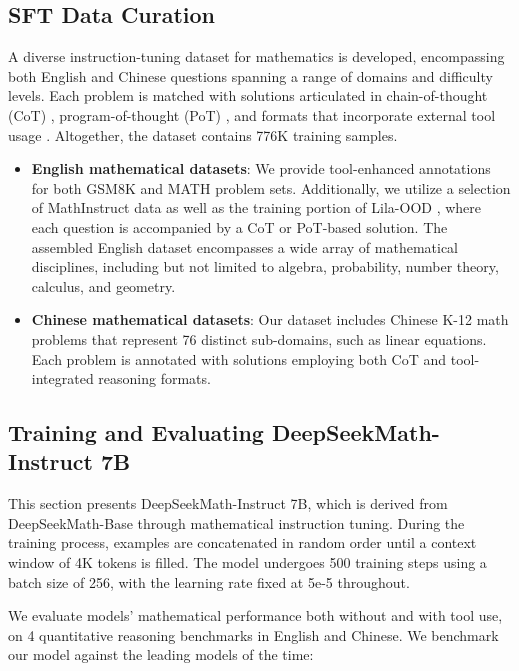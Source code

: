\begin{itemize}[topsep=0pt]
\subsection{SFT Data Curation}

A diverse instruction-tuning dataset for mathematics is developed, encompassing both English and Chinese questions spanning a range of domains and difficulty levels. Each problem is matched with solutions articulated in chain-of-thought (CoT) \citep{cot}, program-of-thought (PoT) \citep{pot,pal}, and formats that incorporate external tool usage \citep{tora}. Altogether, the dataset contains 776K training samples.

\begin{itemize}[topsep=0pt]
    \item \textbf{English mathematical datasets}: We provide tool-enhanced annotations for both GSM8K and MATH problem sets. Additionally, we utilize a selection of MathInstruct \citep{MathInstruct} data as well as the training portion of Lila-OOD \citep{lila}, where each question is accompanied by a CoT or PoT-based solution. The assembled English dataset encompasses a wide array of mathematical disciplines, including but not limited to algebra, probability, number theory, calculus, and geometry.
    \item \textbf{Chinese mathematical datasets}: Our dataset includes Chinese K-12 math problems that represent 76 distinct sub-domains, such as linear equations. Each problem is annotated with solutions employing both CoT and tool-integrated reasoning formats.
\end{itemize}

\subsection{Training and Evaluating DeepSeekMath-Instruct 7B}

This section presents DeepSeekMath-Instruct 7B, which is derived from DeepSeekMath-Base through mathematical instruction tuning. During the training process, examples are concatenated in random order until a context window of 4K tokens is filled. The model undergoes 500 training steps using a batch size of 256, with the learning rate fixed at 5e-5 throughout.

We evaluate models' mathematical performance both without and with tool use, on 4 quantitative reasoning benchmarks in English and Chinese. We benchmark our model against the leading models of the time:


\end{itemize}
